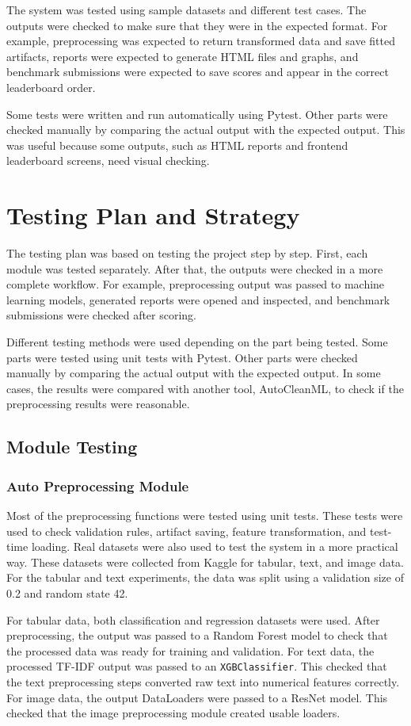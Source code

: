 \documentclass[12pt,a4paper]{report}
\begin{document}
The system was tested using sample datasets and different test cases. The
outputs were checked to make sure that they were in the expected format. For
example, preprocessing was expected to return transformed data and save fitted
artifacts, reports were expected to generate HTML files and graphs, and
benchmark submissions were expected to save scores and appear in the correct
leaderboard order.

Some tests were written and run automatically using Pytest. Other parts were
checked manually by comparing the actual output with the expected output. This
was useful because some outputs, such as HTML reports and frontend leaderboard
screens, need visual checking.
\section{Testing Plan and Strategy}
The testing plan was based on testing the project step by step. First, each
module was tested separately. After that, the outputs were checked in a more
complete workflow. For example, preprocessing output was passed to machine
learning models, generated reports were opened and inspected, and benchmark
submissions were checked after scoring.

Different testing methods were used depending on the part being tested. Some
parts were tested using unit tests with Pytest. Other parts were checked
manually by comparing the actual output with the expected output. In some
cases, the results were compared with another tool, AutoCleanML, to check if
the preprocessing results were reasonable.
\subsection{Module Testing}

\subsubsection{Auto Preprocessing Module}
Most of the preprocessing functions were tested using unit tests. These tests
were used to check validation rules, artifact saving, feature transformation,
and test-time loading. Real datasets were also used to test the system in a
more practical way. These datasets were collected from Kaggle for tabular,
text, and image data. For the tabular and text experiments, the data was split
using a validation size of 0.2 and random state 42.

For tabular data, both classification and regression datasets were used. After
preprocessing, the output was passed to a Random Forest model to check that the
processed data was ready for training and validation. For text data, the
processed TF-IDF output was passed to an \texttt{XGBClassifier}. This checked
that the text preprocessing steps converted raw text into numerical features
correctly. For image data, the output DataLoaders were passed to a ResNet
model. This checked that the image preprocessing module created usable loaders.
\end{document}
